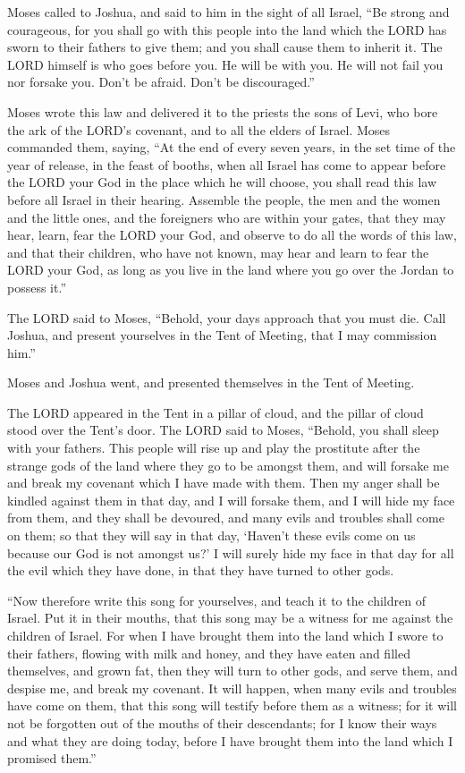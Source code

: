  Moses called to Joshua, and said to him in the sight of all
Israel, ``Be strong and courageous, for you shall go with this people
into the land which the LORD has sworn to their fathers to give them;
and you shall cause them to inherit it.  The LORD himself is
who goes before you. He will be with you. He will not fail you nor
forsake you. Don't be afraid. Don't be discouraged.''

 Moses wrote this law and delivered it to the priests the
sons of Levi, who bore the ark of the LORD's covenant, and to all the
elders of Israel.  Moses commanded them, saying, ``At the
end of every seven years, in the set time of the year of release, in the
feast of booths,  when all Israel has come to appear before
the LORD your God in the place which he will choose, you shall read this
law before all Israel in their hearing.  Assemble the
people, the men and the women and the little ones, and the foreigners
who are within your gates, that they may hear, learn, fear the LORD your
God, and observe to do all the words of this law,  and that
their children, who have not known, may hear and learn to fear the LORD
your God, as long as you live in the land where you go over the Jordan
to possess it.''

 The LORD said to Moses, ``Behold, your days approach that
you must die. Call Joshua, and present yourselves in the Tent of
Meeting, that I may commission him.''

Moses and Joshua went, and presented themselves in the Tent of Meeting.

 The LORD appeared in the Tent in a pillar of cloud, and
the pillar of cloud stood over the Tent's door.  The LORD
said to Moses, ``Behold, you shall sleep with your fathers. This people
will rise up and play the prostitute after the strange gods of the land
where they go to be amongst them, and will forsake me and break my
covenant which I have made with them.  Then my anger shall
be kindled against them in that day, and I will forsake them, and I will
hide my face from them, and they shall be devoured, and many evils and
troubles shall come on them; so that they will say in that day, `Haven't
these evils come on us because our God is not amongst us?' 
I will surely hide my face in that day for all the evil which they have
done, in that they have turned to other gods.

 ``Now therefore write this song for yourselves, and teach
it to the children of Israel. Put it in their mouths, that this song may
be a witness for me against the children of Israel.  For
when I have brought them into the land which I swore to their fathers,
flowing with milk and honey, and they have eaten and filled themselves,
and grown fat, then they will turn to other gods, and serve them, and
despise me, and break my covenant.  It will happen, when
many evils and troubles have come on them, that this song will testify
before them as a witness; for it will not be forgotten out of the mouths
of their descendants; for I know their ways and what they are doing
today, before I have brought them into the land which I promised them.''

